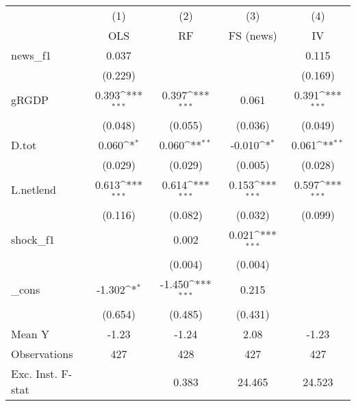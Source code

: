 {
\def\sym#1{\ifmmode^{#1}\else\(^{#1}\)\fi}
\begin{tabular}{l*{4}{c}}
\toprule
            &\multicolumn{1}{c}{(1)}&\multicolumn{1}{c}{(2)}&\multicolumn{1}{c}{(3)}&\multicolumn{1}{c}{(4)}\\
            &\multicolumn{1}{c}{OLS}&\multicolumn{1}{c}{RF}&\multicolumn{1}{c}{FS (news)}&\multicolumn{1}{c}{IV}\\
\midrule
news\_f1     &       0.037         &                     &                     &       0.115         \\
            &     (0.229)         &                     &                     &     (0.169)         \\
\addlinespace
gRGDP       &       0.393\sym{***}&       0.397\sym{***}&       0.061         &       0.391\sym{***}\\
            &     (0.048)         &     (0.055)         &     (0.036)         &     (0.049)         \\
\addlinespace
D.tot       &       0.060\sym{*}  &       0.060\sym{**} &      -0.010\sym{*}  &       0.061\sym{**} \\
            &     (0.029)         &     (0.029)         &     (0.005)         &     (0.028)         \\
\addlinespace
L.netlend   &       0.613\sym{***}&       0.614\sym{***}&       0.153\sym{***}&       0.597\sym{***}\\
            &     (0.116)         &     (0.082)         &     (0.032)         &     (0.099)         \\
\addlinespace
shock\_f1    &                     &       0.002         &       0.021\sym{***}&                     \\
            &                     &     (0.004)         &     (0.004)         &                     \\
\addlinespace
\_cons      &      -1.302\sym{*}  &      -1.450\sym{***}&       0.215         &                     \\
            &     (0.654)         &     (0.485)         &     (0.431)         &                     \\
\midrule
Mean Y      &       -1.23         &       -1.24         &        2.08         &       -1.23         \\
Observations&         427         &         428         &         427         &         427         \\
Exc. Inst. F-stat&                     &       0.383         &      24.465         &      24.523         \\
\bottomrule
\end{tabular}
}
